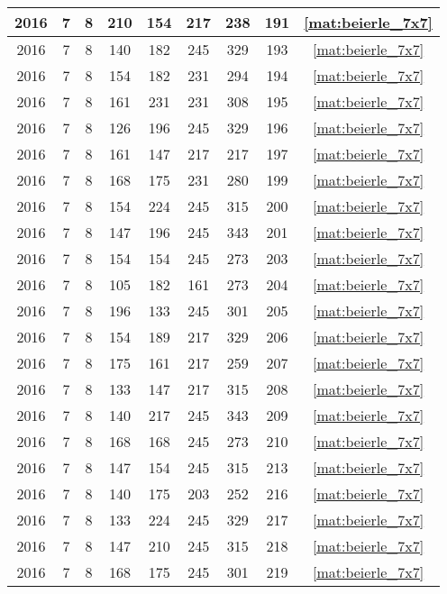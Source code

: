 \begin{longtable}{|c|c|c|c|c|c|c|c|c|}
2016 & 7 & 8 & 210 & 154 & 217 & 238 & 191 & \eqref{mat:beierle_7x7} \\ \hline 
2016 & 7 & 8 & 140 & 182 & 245 & 329 & 193 & \eqref{mat:beierle_7x7} \\ \hline 
2016 & 7 & 8 & 154 & 182 & 231 & 294 & 194 & \eqref{mat:beierle_7x7} \\ \hline 
2016 & 7 & 8 & 161 & 231 & 231 & 308 & 195 & \eqref{mat:beierle_7x7} \\ \hline 
2016 & 7 & 8 & 126 & 196 & 245 & 329 & 196 & \eqref{mat:beierle_7x7} \\ \hline 
2016 & 7 & 8 & 161 & 147 & 217 & 217 & 197 & \eqref{mat:beierle_7x7} \\ \hline 
2016 & 7 & 8 & 168 & 175 & 231 & 280 & 199 & \eqref{mat:beierle_7x7} \\ \hline 
2016 & 7 & 8 & 154 & 224 & 245 & 315 & 200 & \eqref{mat:beierle_7x7} \\ \hline 
2016 & 7 & 8 & 147 & 196 & 245 & 343 & 201 & \eqref{mat:beierle_7x7} \\ \hline 
2016 & 7 & 8 & 154 & 154 & 245 & 273 & 203 & \eqref{mat:beierle_7x7} \\ \hline 
2016 & 7 & 8 & 105 & 182 & 161 & 273 & 204 & \eqref{mat:beierle_7x7} \\ \hline 
2016 & 7 & 8 & 196 & 133 & 245 & 301 & 205 & \eqref{mat:beierle_7x7} \\ \hline 
2016 & 7 & 8 & 154 & 189 & 217 & 329 & 206 & \eqref{mat:beierle_7x7} \\ \hline 
2016 & 7 & 8 & 175 & 161 & 217 & 259 & 207 & \eqref{mat:beierle_7x7} \\ \hline 
2016 & 7 & 8 & 133 & 147 & 217 & 315 & 208 & \eqref{mat:beierle_7x7} \\ \hline 
2016 & 7 & 8 & 140 & 217 & 245 & 343 & 209 & \eqref{mat:beierle_7x7} \\ \hline 
2016 & 7 & 8 & 168 & 168 & 245 & 273 & 210 & \eqref{mat:beierle_7x7} \\ \hline 
2016 & 7 & 8 & 147 & 154 & 245 & 315 & 213 & \eqref{mat:beierle_7x7} \\ \hline 
2016 & 7 & 8 & 140 & 175 & 203 & 252 & 216 & \eqref{mat:beierle_7x7} \\ \hline 
2016 & 7 & 8 & 133 & 224 & 245 & 329 & 217 & \eqref{mat:beierle_7x7} \\ \hline 
2016 & 7 & 8 & 147 & 210 & 245 & 315 & 218 & \eqref{mat:beierle_7x7} \\ \hline 
2016 & 7 & 8 & 168 & 175 & 245 & 301 & 219 & \eqref{mat:beierle_7x7} \\ \hline 

\end{longtable}
